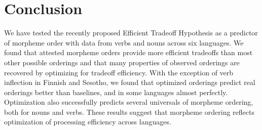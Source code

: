 \documentclass[11pt,letterpaper]{article}
\newcommand{\jd}[1]{\textcolor{Pink}{[jd: #1]}}
\begin{document}
\section{Conclusion}

We have tested the recently proposed Efficient Tradeoff Hypothesis as a predictor of morpheme order with data from verbs and nouns across six languages.
We found that attested morpheme orders provide more efficient tradeoffs than most other possible orderings and that many properties of observed orderings are recovered by optimizing for tradeoff efficiency.
With the exception of verb inflection in Finnish and Sesotho, we found that optimized orderings predict real orderings better than baselines, and in some languages almost perfectly.
Optimization also successfully predicts several universals of morpheme ordering, both for nouns and verbs.
These results suggest that morpheme ordering reflects optimization of processing efficiency across languages.


\printbibliography
\end{document}
